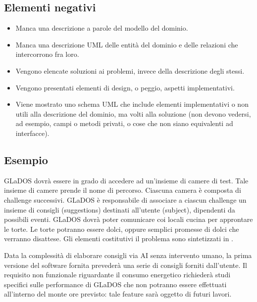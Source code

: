 \documentclass[a4paper,12pt]{report}
\begin{document}
\subsection*{Elementi negativi}
\begin{itemize}
	\item Manca una descrizione a parole del modello del dominio.
	\item Manca una descrizione UML delle entità del dominio e delle relazioni che intercorrono fra loro.
	\item Vengono elencate soluzioni ai problemi, invece della descrizione degli stessi.
	\item Vengono presentati elementi di design, o peggio, aspetti implementativi.
	\item Viene mostrato uno schema UML che include elementi implementativi o non utili alla descrizione del dominio, ma volti alla soluzione (non devono vedersi, ad esempio, campi o metodi privati, o cose che non siano equivalenti ad interfacce).
\end{itemize}

\subsection*{Esempio}
GLaDOS dovrà essere in grado di accedere ad un'insieme di camere di test.
%
Tale insieme di camere prende il nome di percorso.
%
Ciascuna camera è composta di challenge successivi.
%
GLaDOS è responsabile di associare a ciascun challenge un insieme di consigli (suggestions) destinati all'utente (subject), dipendenti da possibili eventi.
%
GLaDOS dovrà poter comunicare coi locali cucina per approntare le torte.
%
Le torte potranno essere dolci, oppure semplici promesse di dolci che verranno disattese.
%
Gli elementi costitutivi il problema sono sintetizzati in .

Data la complessità di elaborare consigli via AI senza intervento umano, la prima versione del software fornita prevederà una serie di consigli forniti dall'utente.
%
Il requisito non funzionale riguardante il consumo energetico richiederà studi specifici sulle performance di GLaDOS che non potranno essere effettuati all'interno del monte ore previsto: tale feature sarà oggetto di futuri lavori.
\end{document}
